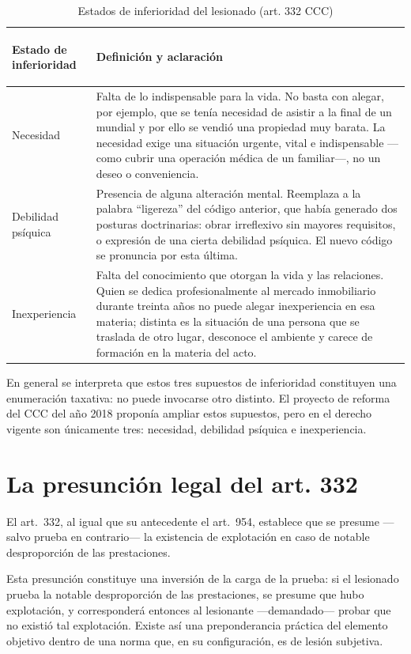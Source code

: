 \documentclass[12pt,oneside]{book}
\begin{document}
\begin{table}[H]
\centering
\caption{Estados de inferioridad del lesionado (art. 332 CCC)}
\begin{tabularx}{\textwidth}{>{\bfseries\raggedright\arraybackslash}p{} X}
\toprule
\textbf{Estado de inferioridad} & \textbf{Definición y aclaración} \\
\midrule
Necesidad & Falta de lo indispensable para la vida. No basta con alegar, por ejemplo, que se tenía necesidad de asistir a la final de un mundial y por ello se vendió una propiedad muy barata. La necesidad exige una situación urgente, vital e indispensable —como cubrir una operación médica de un familiar—, no un deseo o conveniencia. \\
Debilidad psíquica & Presencia de alguna alteración mental. Reemplaza a la palabra ``ligereza'' del código anterior, que había generado dos posturas doctrinarias: obrar irreflexivo sin mayores requisitos, o expresión de una cierta debilidad psíquica. El nuevo código se pronuncia por esta última. \\
Inexperiencia & Falta del conocimiento que otorgan la vida y las relaciones. Quien se dedica profesionalmente al mercado inmobiliario durante treinta años no puede alegar inexperiencia en esa materia; distinta es la situación de una persona que se traslada de otro lugar, desconoce el ambiente y carece de formación en la materia del acto. \\
\bottomrule
\end{tabularx}
\end{table}

\begin{important}
En general se interpreta que estos tres supuestos de inferioridad constituyen una enumeración taxativa: no puede invocarse otro distinto. El proyecto de reforma del CCC del año 2018 proponía ampliar estos supuestos, pero en el derecho vigente son únicamente tres: necesidad, debilidad psíquica e inexperiencia.
\end{important}

\section{La presunción legal del art. 332}

El art.\ 332, al igual que su antecedente el art.\ 954, establece que se presume —salvo prueba en contrario— la existencia de explotación en caso de notable desproporción de las prestaciones.

\begin{important}
Esta presunción constituye una inversión de la carga de la prueba: si el lesionado prueba la notable desproporción de las prestaciones, se presume que hubo explotación, y corresponderá entonces al lesionante —demandado— probar que no existió tal explotación. Existe así una preponderancia práctica del elemento objetivo dentro de una norma que, en su configuración, es de lesión subjetiva.
\end{important}
\end{document}
